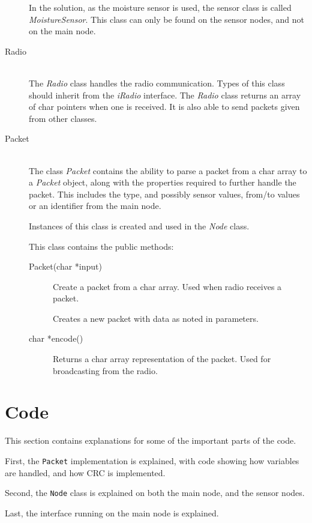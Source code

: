 \begin{description}
In the solution, as the moisture sensor is used, the sensor class is called \textit{MoistureSensor}. This class can only be found on the sensor nodes, and not on the main node.


\item[Radio] \hfill \\
The \textit{Radio} class handles the radio communication. Types of this class should inherit from the \textit{iRadio} interface. The \textit{Radio} class returns an array of char pointers when one is received. It is also able to send packets given from other classes.

\item[Packet] \hfill \\
The class \textit{Packet} contains the ability to parse a packet from a char array to a \textit{Packet} object, along with the properties required to further handle the packet. This includes the type, and possibly sensor values, from/to values or an identifier from the main node.

Instances of this class is created and used in the \textit{Node} class.

This class contains the public methods:
\begin{description}
\item[Packet(char *input)] Create a packet from a char array. Used when radio receives a packet.
\item[{\parbox[t]{0.6\linewidth}{Packet(PacketType packetTypeInput, \\ uint16\_t addresserInput, \\ uint16\_t addresseeInput, \\ uint16\_t originInput, \\ uint16\_t value1Input, \\ uint16\_t value2Input, \\ uint16\_t value3Input)}}] \item[] Creates a new packet with data as noted in parameters.
\item[char *encode()] Returns a char array representation of the packet. Used for broadcasting from the radio.
\end{description}

\end{description}


\section{Code}
This section contains explanations for some of the important parts of the code.

First, the \texttt{Packet} implementation is explained, with code showing how variables are handled, and how CRC is implemented.

Second, the \texttt{Node} class is explained on both the main node, and the sensor nodes.

Last, the interface running on the main node is explained.



